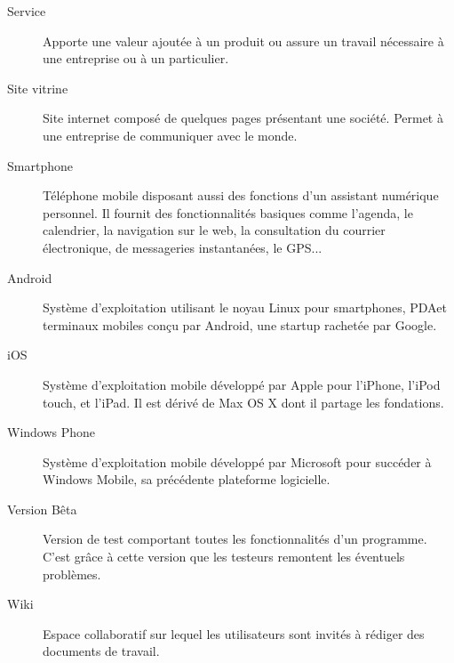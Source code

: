 \documentclass{life-fr}
\begin{document}
\begin{description}
\item[Service]
Apporte une valeur ajoutée à un produit ou assure un travail nécessaire à une entreprise ou à un particulier.

\item[Site vitrine]
Site internet composé de quelques pages présentant une société. Permet à une entreprise de communiquer avec le monde.

\item[Smartphone]
Téléphone mobile disposant aussi des fonctions d'un assistant numérique personnel. Il fournit des fonctionnalités basiques comme l'agenda, le calendrier, la navigation sur le web, la consultation du courrier électronique, de messageries instantanées, le GPS...

\item[Android]
Système d’exploitation utilisant le noyau Linux pour smartphones, PDAet terminaux mobiles conçu par Android, une startup rachetée par Google.

\item[iOS]
Système d’exploitation mobile développé par Apple pour l'iPhone, l'iPod touch, et l'iPad. Il est dérivé de Max OS X dont il partage les fondations.

\item[Windows Phone]
Système d’exploitation mobile développé par Microsoft pour succéder à Windows Mobile, sa précédente plateforme logicielle.

\item[Version Bêta]
Version de test comportant toutes les fonctionnalités d'un programme. C'est grâce à cette version que les testeurs remontent les éventuels problèmes.

\item[Wiki]
Espace collaboratif sur lequel les utilisateurs sont invités à rédiger des documents de travail.


\end{description}
\end{document}

